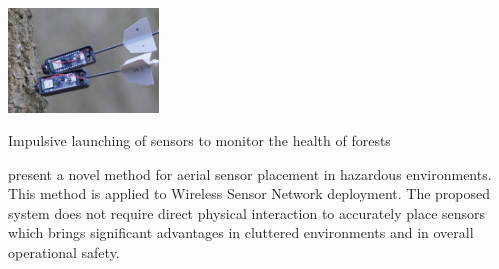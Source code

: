 
\begin{marginfigure}%
  \includegraphics[width=4cm]{images/stage_sota/arrow.jpg}
  \caption{Impulsive launching of sensors to monitor the health of forests \cite{sensor_placement_uav}}
\end{marginfigure}

\cite{sensor_placement_uav} \hspace*{0.3cm} \textit{}
\hspace*{0.5cm} present a novel method for aerial sensor placement in hazardous environments. This method is applied to Wireless Sensor Network deployment. The proposed system does not require direct physical interaction to accurately place sensors which brings significant advantages in cluttered environments and in overall operational safety.








